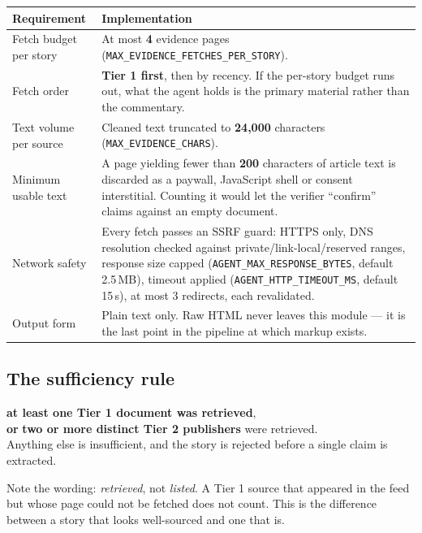 \documentclass[11pt,a4paper]{article}
\newcommand{\var}[1]{\texttt{\small\hyphenpenalty=0\exhyphenpenalty=0\relax #1}}
\newcommand{\us}{\_\discretionary{}{}{}}
\newcommand{\brk}{\hyphenpenalty=0\exhyphenpenalty=0\relax}
\newcommand{\code}[1]{\texttt{\small\brk #1}}
\begin{document}
\begin{center}
\small
\begin{tabularx}{\textwidth}{@{}p{4.6cm} >{\RaggedRight}X@{}}
\toprule
\textbf{Requirement} & \textbf{Implementation} \\
\midrule
Fetch budget per story & At most \textbf{4} evidence pages
  (\code{MAX\_EVIDENCE\_}\allowbreak\code{FETCHES\_PER\_STORY}). \\
Fetch order & \textbf{Tier 1 first}, then by recency. If the per-story budget runs
  out, what the agent holds is the primary material rather than the commentary. \\
Text volume per source & Cleaned text truncated to \textbf{24,000} characters
  (\code{MAX\_EVIDENCE\_CHARS}). \\
Minimum usable text & A page yielding fewer than \textbf{200} characters of
  article text is discarded as a paywall, JavaScript shell or consent
  interstitial. Counting it would let the verifier ``confirm'' claims against an
  empty document. \\
Network safety & Every fetch passes an SSRF guard: HTTPS only, DNS resolution
  checked against private/link-local/reserved ranges, response size capped
  (\var{AGENT\us MAX\us RESPONSE\us BYTES}, default 2.5\,MB), timeout applied
  (\var{AGENT\us HTTP\us TIMEOUT\us MS}, default 15\,s), at most 3 redirects, each
  revalidated. \\
Output form & Plain text only. Raw HTML never leaves this module --- it is the
  last point in the pipeline at which markup exists. \\
\bottomrule
\end{tabularx}
\end{center}

\subsection{The sufficiency rule}

\begin{gobox}
\textbf{at least one Tier 1 document was retrieved}, \\[0.15em]
\hspace*{1.1em}\textbf{or} \textbf{two or more distinct Tier 2 publishers} were retrieved. \\[0.35em]
Anything else is insufficient, and the story is rejected before a single claim is
extracted.
\end{gobox}

Note the wording: \emph{retrieved}, not \emph{listed}. A Tier 1 source that
appeared in the feed but whose page could not be fetched does not count. This is
the difference between a story that looks well-sourced and one that is.
\end{document}
